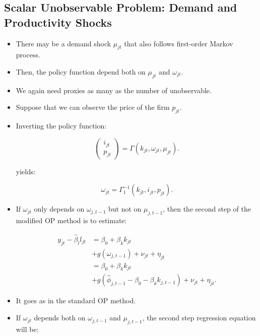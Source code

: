 \documentclass[]{book}
\providecommand{\tightlist}{%
  \setlength{\itemsep}{0pt}\setlength{\parskip}{0pt}}
\begin{document}
\subsection{Scalar Unobservable Problem: Demand and Productivity
Shocks}\label{scalar-unobservable-problem-demand-and-productivity-shocks}

\begin{itemize}
\tightlist
\item
  There may be a demand shock \(\mu_{jt}\) that also follows first-order
  Markov process.
\item
  Then, the policy function depend both on \(\mu_{jt}\) and
  \(\omega_{jt}\).
\item
  We again need proxies as many as the number of unobservable.
\item
  Suppose that we can observe the price of the firm \(p_{jt}\).
\item
  Inverting the policy function:

  \begin{equation}
  \begin{pmatrix}
  i_{jt}\\ p_{jt}
  \end{pmatrix}
  = \Gamma(k_{jt}, \omega_{jt}, \mu_{jt}).
  \end{equation}

  yields:

  \begin{equation}
  \omega_{jt} = \Gamma_1^{- 1}(k_{jt}, i_{jt}, p_{jt}).
  \end{equation}
\item
  If \(\omega_{jt}\) only depends on \(\omega_{j, t - 1}\) but not on
  \(\mu_{j, t - 1}\), then the second step of the modified OP method is
  to estimate:

  \begin{equation}
  \begin{split}
  y_{jt} - \hat{\beta}_l l_{jt} 
  &= \beta_0 + \beta_k k_{jt}\\
  & + g(\omega_{j, t - 1}) + \nu_{jt} + \eta_{jt}\\
  &= \beta_0 + \beta_k k_{jt}\\
  & + g(\hat{\phi}_{j, t - 1} - \beta_0 - \beta_k k_{j, t - 1}) + \nu_{jt} + \eta_{jt}.
  \end{split}
  \end{equation}
\item
  It goes as in the standard OP method.
\item
  If \(\omega_{jt}\) depends both on \(\omega_{j, t - 1}\) and
  \(\mu_{j, t - 1}\), the second step regression equation will be:


\end{itemize}
\end{document}
